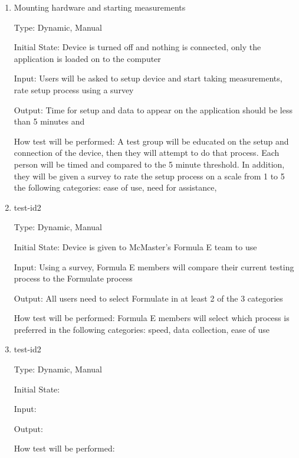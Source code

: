 \documentclass[12pt, titlepage]{article}
\begin{document}
\begin{enumerate}

\item{Mounting hardware and starting measurements\\}

Type: Dynamic, Manual
          
Initial State: Device is turned off and nothing is connected, only the application is loaded on to the computer
          
Input: Users will be asked to setup device and start taking measurements, rate setup process using a survey
          
Output: Time for setup and data to appear on the application should be less than 5 minutes and 
          
How test will be performed: A test group will be educated on the setup and connection of the device, then they will attempt to do that process. 
Each person will be timed and compared to the 5 minute threshold. In addition, they will be given a survey to rate the setup process on a scale from 
1 to 5 the following categories: ease of use, need for assistance,  

\item{test-id2\\}

Type: Dynamic, Manual
					
Initial State: Device is given to McMaster's Formula E team to use
					
Input: Using a survey, Formula E members will compare their current testing process to the Formulate process
					
Output: All users need to select Formulate in at least 2 of the 3 categories
					
How test will be performed: Formula E members will select which process is preferred in the following categories: speed, data collection, ease of use

\item{test-id2\\}

Type: Dynamic, Manual
					
Initial State: 
					
Input: 
					
Output: 
					
How test will be performed: 

\end{enumerate}
\end{document}
